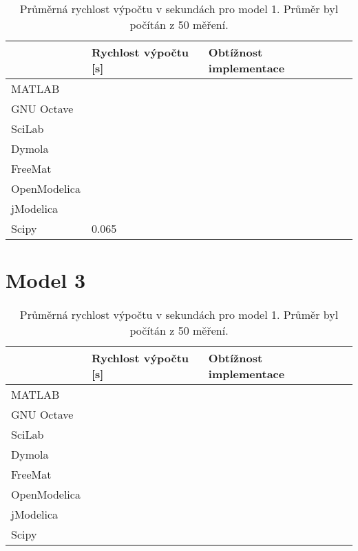 \begin{table}[ht]
\centering
\begin{tabular}{|l|l|l|l|}
\hline
             & Rychlost výpočtu {[}s{]} & Obtížnost implementace &  \\ \hline
MATLAB       &                          &  &  \\ \hline
GNU Octave   &                          &  &  \\ \hline
SciLab       &                          &  &  \\ \hline
Dymola       &                          &  &  \\ \hline
FreeMat &                          &  &  \\ \hline
OpenModelica    &                          &  &  \\ \hline
jModelica        &                     &  &  \\ \hline
Scipy             &      0.065                    &  &  \\ \hline
\end{tabular}
\caption{Průměrná rychlost výpočtu v sekundách pro model 1. Průměr byl počítán z 50 měření.}
\label{tab:kruh-tabulka}
\end{table}


\section{Model 3}
\label{srovnani-tuhy}


\begin{table}[ht]
\centering
\begin{tabular}{|l|l|l|l|}
\hline
             & Rychlost výpočtu {[}s{]} & Obtížnost implementace &  \\ \hline
MATLAB       &                          &  &  \\ \hline
GNU Octave   &                          &  &  \\ \hline
SciLab       &                          &  &  \\ \hline
Dymola       &                          &  &  \\ \hline
FreeMat &                          &  &  \\ \hline
OpenModelica    &                          &  &  \\ \hline
jModelica        &                          &  &  \\ \hline
 Scipy            &                          &  &  \\ \hline
\end{tabular}
\caption{Průměrná rychlost výpočtu v sekundách pro model 1. Průměr byl počítán z 50 měření.}
\label{tab:tuhy-tabulka}
\end{table}

